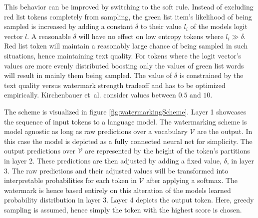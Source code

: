     This behavior can be improved by switching to the soft rule. 
	Instead of excluding red list tokens completely from sampling, 
	the green list item's likelihood of being sampled is increased by adding a constant $\delta$ to their value $l_i$ of the models logit vector $l$.
	A reasonable $\delta$ will have no effect on low entropy tokens where $l_i \gg \delta$.
	Red list token will maintain a reasonably large chance of being sampled in such situations, hence maintaining text quality. 
	For tokens where the logit vector's values are more evenly distributed boosting only the values of green list words will result in mainly them being sampled.
	The value of $\delta$ is constrained by the text quality versus watermark strength tradeoff and has to be optimized empirically.
	Kirchenbauer et~al.\cite{kirchenbauer2023watermark} consider values between $0.5$ and $10$.
	
    The scheme is visualized in figure \ref{fig:watermarkingScheme}.
    Layer 1 showcases the sequence of input tokens to a language model.
    The watermarking scheme is model agnostic as long as raw predictions over a vocabulary $\mathcal{V}$ are the output.
    In this case the model is depicted as a fully connected neural net for simplicity.
    The output predictions over $\mathcal{V}$ are represented by the height of the token's partitions in layer 2.
    These predictions are then adjusted by adding a fixed value, $\delta$, in layer 3.
    The raw predictions and their adjusted values will be transformed into interpretable probabilities for each token in $\mathcal{V}$ after applying a softmax.
    The watermark is hence based entirely on this alteration of the models learned probability distribution in layer 3.
    Layer 4 depicts the output token.
    Here, greedy sampling is assumed, hence simply the token with the highest score is chosen. 

